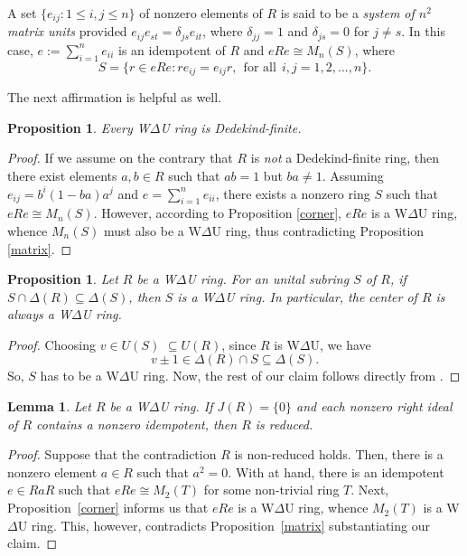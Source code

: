 \documentclass[12pt]{amsart}
\newtheorem{proposition}[theorem]{Proposition}
\newtheorem{lemma}[theorem]{Lemma}
\theoremstyle{definition}
\begin{document}
A set $\{e_{ij} : 1 \le i, j \le n\}$ of nonzero elements of $R$ is said to be a {\it system of $n^2$ matrix units} provided $e_{ij}e_{st} = \delta_{js}e_{it}$, where $\delta_{jj} = 1$ and $\delta_{js} = 0$ for $j \neq s$. In this case, $e := \sum_{i=1}^{n} e_{ii}$ is an idempotent of $R$ and $eRe \cong M_n(S)$, where $$S = \{r \in eRe : re_{ij} = e_{ij}r,~~\textrm{for all}~~ i, j = 1, 2, . . . , n\}.$$

\medskip

The next affirmation is helpful as well.

\begin{proposition}\label{dedekind}
Every W$\Delta$U ring is Dedekind-finite.
\end{proposition}

\begin{proof}
If we assume on the contrary that $R$ is {\it not} a Dedekind-finite ring, then there exist elements $a, b \in R$ such that $ab = 1$ but $ba \neq 1$. Assuming $e_{ij} = b^i(1-ba)a^j$ and $e =\sum_{i=1}^{n}e_{ii}$, there exists a nonzero ring $S$ such that $eRe \cong M_n(S)$. However, according to Proposition \ref{corner}, $eRe$ is a W$\Delta$U ring, whence $M_n(S)$ must also be a W$\Delta$U ring, thus contradicting Proposition \ref{matrix}.
\end{proof}

\begin{proposition}\label{subring}
Let \(R\) be a W$\Delta$U ring. For an unital subring \(S\) of \(R\), if \(S \cap \Delta(R) \subseteq \Delta(S)\), then \(S\) is a W$\Delta$U ring. In particular, the center of \(R\) is always a W$\Delta$U ring.
\end{proposition}

\begin{proof}
Choosing \(v \in U(S)\) \(\subseteq U(R)\), since \(R\) is W$\Delta$U, we have
\[
v\pm1 \in \Delta(R) \cap S \subseteq \Delta(S).
\] So, \(S\) has to be a W$\Delta$U ring. Now, the rest of our claim follows directly from \cite[Corollary 8]{2}.
\end{proof}

\begin{lemma}\label{reduced}
Let \(R\) be a W$\Delta$U ring. If \(J(R) = \{0\}\) and each nonzero right ideal of \(R\) contains a nonzero idempotent, then \(R\) is reduced.
\end{lemma}

\begin{proof}
Suppose that the contradiction \(R\) is non-reduced holds. Then, there is a nonzero element \(a \in R\) such that \(a^2 = 0\). With \cite[Theorem 2.1]{3} at hand, there is an idempotent \(e \in RaR\) such that \(eRe \cong M_2(T)\) for some non-trivial ring \(T\). Next, Proposition~\ref{corner} informs us that $eRe$ is a W$\Delta$U ring, whence $M_2(T)$ is a W$\Delta$U ring. This, however, contradicts Proposition~\ref{matrix} substantiating our claim.
\end{proof}
\end{document}
